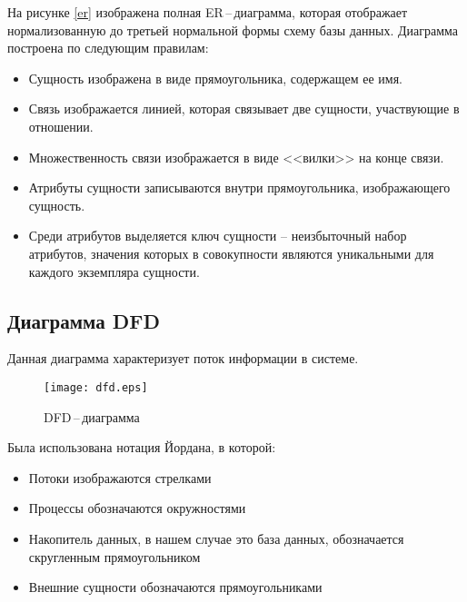 На рисунке \ref{er} изображена полная ER\,--\,диаграмма, которая отображает
нормализованную до третьей нормальной формы схему базы данных.
\newpar
Диаграмма построена по следующим правилам:
\begin{itemize}
    \item Сущность изображена в виде прямоугольника, содержащем ее имя.
    \item Связь изображается линией, которая связывает две сущности, участвующие в
        отношении.
    \item Множественность связи изображается в виде <<вилки>> на конце связи.
    \item Атрибуты сущности записываются внутри прямоугольника, изображающего сущность.
    \item Среди атрибутов выделяется ключ сущности -- неизбыточный набор атрибутов,
        значения которых в совокупности являются уникальными для каждого экземпляра
        сущности.
\end{itemize}

\subsection{Диаграмма DFD}
Данная диаграмма характеризует поток информации в системе.
\begin{figure}[htb]
    \centerline{\texttt{[image: dfd.eps]}}
    \caption{DFD\,--\,диаграмма}\label{dfd}
\end{figure}
Была использована нотация Йордана, в которой:
\begin{itemize}
    \item Потоки изображаются стрелками
    \item Процессы обозначаются окружностями
    \item Накопитель данных, в нашем случае это база данных, обозначается скругленным
        прямоугольником
    \item Внешние сущности обозначаются прямоугольниками
\end{itemize}

